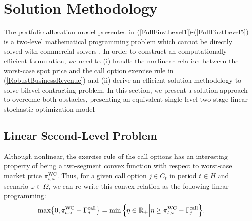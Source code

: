 \section{Solution Methodology}
\label{SolMeth}

	The portfolio allocation model presented in (\ref{FullFirstLevel1})-(\ref{FullFirstLevel5}) is a two-level mathematical programming problem which cannot be directly solved with commercial solvers \cite{Xpress}. In order to construct an computationally efficient formulation, we need to (i) handle the nonlinear relation between the worst-case spot price and the call option exercise rule in (\ref{RobustBusinessRevenue}) and (ii) derive an efficient solution methodology to solve bilevel contracting problem. In this section, we present a solution approach to overcome both obstacles, presenting an equivalent single-level two-stage linear stochastic optimization model.

\subsection{Linear Second-Level Problem}
\label{LinSLProb}

	Although nonlinear, the exercise rule of the call options has an interesting property of being a two-segment convex function with respect to worst-case market price $\pi_{t,\omega}^{\text{WC}}$. Thus, for a given call option $j \in C_{t}$ in period $t \in H$ and scenario $\omega \in \Omega$, we can re-write this convex relation as the following linear programming:
%
\begin{align}
	& \hspace{-0.29cm} \text{max}\big\{0, \pi_{t,\omega}^{\text{WC}} - \Gamma_{j}^{\text{call}}\big\} = \min\Big\{\eta \in \mathbb{R}_{+} \Big| \eta \geq \pi_{t,\omega}^{\text{WC}} - \Gamma_{j}^{\text{call}} \Big\}. \label{ReformExercRule}
\end{align}

